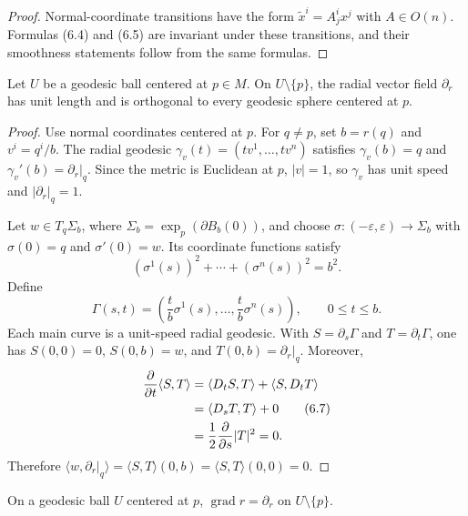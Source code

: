 \begin{proof}
\sketch
Normal-coordinate transitions have the form
$\widetilde x^i=A^i_jx^j$ with $A\in O(n)$.  Formulas (6.4) and (6.5) are
invariant under these transitions, and their smoothness statements follow
from the same formulas.
\end{proof}

\begin{theorem}
\label{thm:gauss-lemma}

Let $U$ be a geodesic ball centered at $p\in M$.  On
$U\setminus\{p\}$, the radial vector field $\partial_r$ has unit length and is
orthogonal to every geodesic sphere centered at $p$.
\end{theorem}

\begin{proof}
\sketch
Use normal coordinates centered at $p$.  For $q\ne p$, set $b=r(q)$ and
$v^i=q^i/b$.  The radial geodesic $\gamma_v(t)=(tv^1,\ldots,tv^n)$ satisfies
$\gamma_v(b)=q$ and $\gamma_v'(b)=\partial_r|_q$.  Since the metric is
Euclidean at $p$, $|v|=1$, so $\gamma_v$ has unit speed and
$|\partial_r|_q=1$.

Let $w\in T_q\Sigma_b$, where
$\Sigma_b=\exp_p(\partial B_b(0))$, and choose
$\sigma:(-\varepsilon,\varepsilon)\to\Sigma_b$ with
$\sigma(0)=q$ and $\sigma'(0)=w$.  Its coordinate functions satisfy
\begin{equation}
(\sigma^1(s))^2 + \cdots + (\sigma^n(s))^2 = b^2. \tag{6.6}
\end{equation}
Define
\[
\Gamma(s,t)=\left(\frac{t}{b}\sigma^1(s),\ldots,
\frac{t}{b}\sigma^n(s)\right),
\qquad 0\leq t\leq b.
\]
Each main curve is a unit-speed radial geodesic.  With
$S=\partial_s\Gamma$ and $T=\partial_t\Gamma$, one has
$S(0,0)=0$, $S(0,b)=w$, and $T(0,b)=\partial_r|_q$.  Moreover,
\begin{align}
\frac{\partial}{\partial t}\langle S,T\rangle
&=\langle D_tS,T\rangle+\langle S,D_tT\rangle \notag\\
&=\langle D_sT,T\rangle+0 \tag{6.7}\\
&=\frac12\frac{\partial}{\partial s}|T|^2=0. \notag
\end{align}
Therefore $\langle w,\partial_r|_q\rangle
=\langle S,T\rangle(0,b)=\langle S,T\rangle(0,0)=0$.
\end{proof}

\begin{corollary}
\label{cor:gradient-radial-distance}

On a geodesic ball $U$ centered at $p$,
$\operatorname{grad}r=\partial_r$ on $U\setminus\{p\}$.
\end{corollary}

